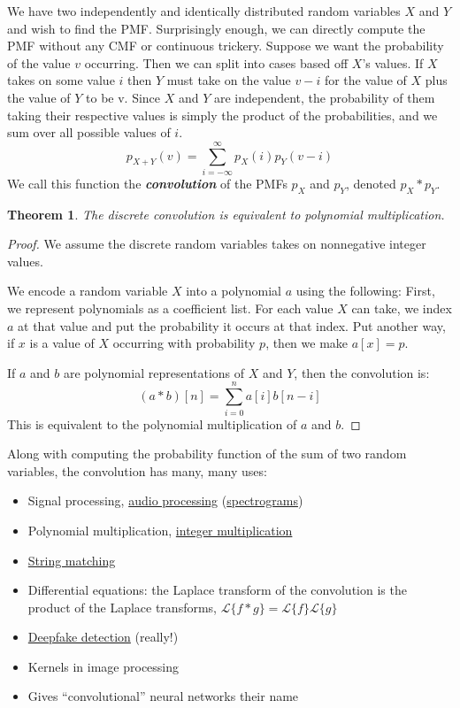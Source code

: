 \documentclass[11pt, oneside]{article}
\newcommand{\emphasis}[1]{\textbf{\textit{#1}}}
\theoremstyle{plain}
\newtheorem{theorem}{Theorem}[section]
\theoremstyle{definition}
\begin{document}
We have two independently and identically distributed random variables \( X
\) and \( Y \) and wish to find the PMF. Surprisingly enough, we can directly
compute the PMF without any CMF or continuous trickery. Suppose we want the
probability of the value \( v \) occurring. Then we can split into cases based
off \( X \)'s values. If \( X \) takes on some value \( i \) then \( Y \) must
take on the value \( v - i \) for the value of \( X \) plus the value of \( Y
\) to be v. Since \( X \) and \( Y \) are independent, the probability of them
taking their respective values is simply the product of the probabilities, and
we sum over all possible values of \( i \).
\[ p_{X + Y}(v) = \sum^{\infty}_{i = -\infty} p_X(i) p_Y(v - i) \]
We call this function the \emphasis{convolution} of the
PMFs \( p_X \) and \( p_Y \), denoted \( p_X * p_Y \).
\begin{theorem}
  The discrete convolution is equivalent to polynomial multiplication.
\end{theorem}
\begin{proof}
  We assume the discrete random variables takes on nonnegative integer values.

  We encode a random variable \( X \) into a polynomial \( a \) using the
  following: First, we represent polynomials as a coefficient list. For
  each value \( X \) can take, we index \( a \) at that value and put the
  probability it occurs at that index. Put another way, if \( x \) is a value
  of \( X \) occurring with probability \( p \), then we make \( a[x] = p \).

  If \( a \) and \( b \) are polynomial representations of \( X \) and \( Y
  \), then the convolution is: \[ (a * b)[n] = \sum^n_{i = 0} a[i] b[n - i] \]
  This is equivalent to the polynomial multiplication of \( a \) and \( b \).
\end{proof}

Along with computing the probability function of the sum of
two random variables, the convolution has many, many uses:
\begin{itemize}
  \item Signal processing,
    \href{https://www.ee.columbia.edu/~dpwe/papers/Wang03-shazam.pdf}{audio
    processing} (\href{https://arxiv.org/abs/1609.03499}{spectrograms})
  \item Polynomial multiplication,
    \href{https://hal.archives-ouvertes.fr/hal-02070778/document}{integer
    multiplication}
  \item \href{http://nablab.rice.edu/publications/JoA2005.pdf}{String matching}
  \item Differential equations: the Laplace transform of
  the convolution is the product of the Laplace transforms,
  \( \mathcal{L}\{f * g\} = \mathcal{L}\{f\} \mathcal{L}\{g\} \)
  \item \href{https://arxiv.org/abs/1911.06465}{Deepfake detection} (really!)
  \item Kernels in image processing 
  \item Gives \enquote{convolutional} neural networks their name
\end{itemize}
\end{document}
